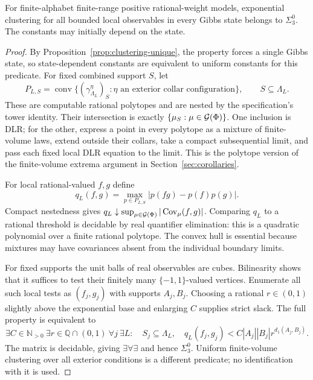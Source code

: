 \begin{proposition}\label{prop:full-arith}
For finite-alphabet finite-range positive rational-weight models, exponential clustering for all bounded local observables in every Gibbs state belongs to $\Sigma^0_3$. The constants may initially depend on the state.
\end{proposition}
\begin{proof}
By Proposition~\ref{prop:clustering-unique}, the property forces a single Gibbs state, so state-dependent constants are equivalent to uniform constants for this predicate. For fixed combined support $S$, let
\[
 P_{L,S}=\operatorname{conv}\{(\gamma_{\Lambda_L}^{\eta})_S:
                         \eta\text{ an exterior collar configuration}\},
 \qquad S\subseteq\Lambda_L.
\]
These are computable rational polytopes and are nested by the specification's tower identity. Their intersection is exactly $\{\mu_S:\mu\in\mathcal G(\Phi)\}$. One inclusion is DLR; for the other, express a point in every polytope as a mixture of finite-volume laws, extend outside their collars, take a compact subsequential limit, and pass each fixed local DLR equation to the limit. This is the polytope version of the finite-volume extrema argument in Section~\ref{sec:corollaries}.

For local rational-valued $f,g$ define
\[
 q_L(f,g)=\max_{p\in P_{L,S}}|p(fg)-p(f)p(g)|.
\]
Compact nestedness gives $q_L\downarrow\sup_{\mu\in\mathcal G(\Phi)}|\operatorname{Cov}_\mu(f,g)|$. Comparing $q_L$ to a rational threshold is decidable by real quantifier elimination: this is a quadratic polynomial over a finite rational polytope. The convex hull is essential because mixtures may have covariances absent from the individual boundary limits.

For fixed supports the unit balls of real observables are cubes. Bilinearity shows that it suffices to test their finitely many $\{-1,1\}$-valued vertices. Enumerate all such local tests as $(f_j,g_j)$ with supports $A_j,B_j$. Choosing a rational $r\in(0,1)$ slightly above the exponential base and enlarging $C$ supplies strict slack. The full property is equivalent to
\[
 \exists C\in\mathbb N_{>0}\ \exists r\in\mathbb Q\cap(0,1)\
 \forall j\ \exists L:\quad
 S_j\subseteq\Lambda_L,\quad
 q_L(f_j,g_j)<C|A_j||B_j|r^{d_1(A_j,B_j)}.
\]
The matrix is decidable, giving $\exists\forall\exists$ and hence $\Sigma^0_3$. Uniform finite-volume clustering over all exterior conditions is a different predicate; no identification with it is used.
\end{proof}

